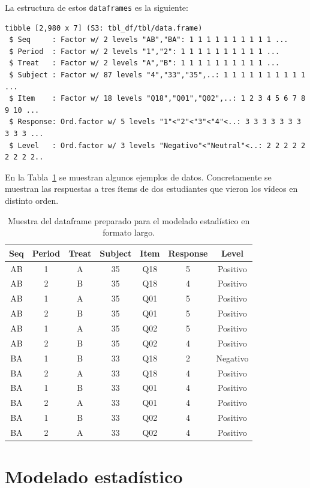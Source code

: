 \documentclass[
  12pt,
  a4paper,
  extrafontsizes,
  onecolumn,
  openright,
  table]{memoir}
\begin{document}
La estructura de estos \texttt{dataframes} es la siguiente:

\begin{verbatim}
tibble [2,980 x 7] (S3: tbl_df/tbl/data.frame)
 $ Seq     : Factor w/ 2 levels "AB","BA": 1 1 1 1 1 1 1 1 1 1 ...
 $ Period  : Factor w/ 2 levels "1","2": 1 1 1 1 1 1 1 1 1 1 ...
 $ Treat   : Factor w/ 2 levels "A","B": 1 1 1 1 1 1 1 1 1 1 ...
 $ Subject : Factor w/ 87 levels "4","33","35",..: 1 1 1 1 1 1 1 1 1 1 ...
 $ Item    : Factor w/ 18 levels "Q18","Q01","Q02",..: 1 2 3 4 5 6 7 8 9 10 ...
 $ Response: Ord.factor w/ 5 levels "1"<"2"<"3"<"4"<..: 3 3 3 3 3 3 3 3 3 3 ...
 $ Level   : Ord.factor w/ 3 levels "Negativo"<"Neutral"<..: 2 2 2 2 2 2 2 2 2..
\end{verbatim}

En la Tabla~\ref{tbl-df_clean} se muestran algunos ejemplos de datos.
Concretamente se muestran las respuestas a tres ítems de dos estudiantes
que vieron los vídeos en distinto orden.

\hypertarget{tbl-df_clean}{}
\begin{longtable}{ccccccc}
\caption{\label{tbl-df_clean}Muestra del dataframe preparado para el modelado estadístico en formato
largo. }\tabularnewline

\toprule
Seq & Period & Treat & Subject & Item & Response & Level \\ 
\midrule
AB & 1 & A & 35 & Q18 & 5 & Positivo \\ 
AB & 2 & B & 35 & Q18 & 4 & Positivo \\ 
AB & 1 & A & 35 & Q01 & 5 & Positivo \\ 
AB & 2 & B & 35 & Q01 & 5 & Positivo \\ 
AB & 1 & A & 35 & Q02 & 5 & Positivo \\ 
AB & 2 & B & 35 & Q02 & 4 & Positivo \\ 
BA & 1 & B & 33 & Q18 & 2 & Negativo \\ 
BA & 2 & A & 33 & Q18 & 4 & Positivo \\ 
BA & 1 & B & 33 & Q01 & 4 & Positivo \\ 
BA & 2 & A & 33 & Q01 & 4 & Positivo \\ 
BA & 1 & B & 33 & Q02 & 4 & Positivo \\ 
BA & 2 & A & 33 & Q02 & 4 & Positivo \\ 
\bottomrule
\end{longtable}


\hypertarget{sec-modelado}{%
\chapter{Modelado estadístico}\label{sec-modelado}}
\end{document}
